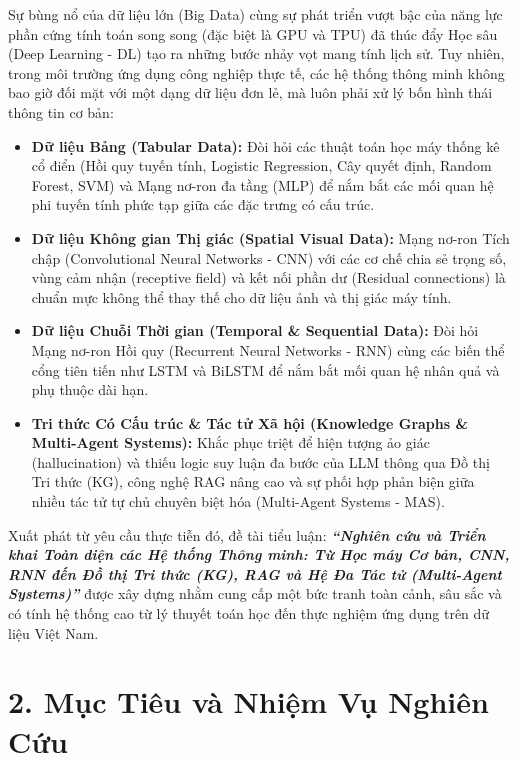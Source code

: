 \documentclass[12pt,a4paper]{report}
\begin{document}
Sự bùng nổ của dữ liệu lớn (Big Data) cùng sự phát triển vượt bậc của năng lực phần cứng tính toán song song (đặc biệt là GPU và TPU) đã thúc đẩy Học sâu (Deep Learning - DL) tạo ra những bước nhảy vọt mang tính lịch sử. Tuy nhiên, trong môi trường ứng dụng công nghiệp thực tế, các hệ thống thông minh không bao giờ đối mặt với một dạng dữ liệu đơn lẻ, mà luôn phải xử lý bốn hình thái thông tin cơ bản:
\begin{itemize}[leftmargin=1.2cm]
    \item \textbf{Dữ liệu Bảng (Tabular Data):} Đòi hỏi các thuật toán học máy thống kê cổ điển (Hồi quy tuyến tính, Logistic Regression, Cây quyết định, Random Forest, SVM) và Mạng nơ-ron đa tầng (MLP) để nắm bắt các mối quan hệ phi tuyến tính phức tạp giữa các đặc trưng có cấu trúc.
    \item \textbf{Dữ liệu Không gian Thị giác (Spatial Visual Data):} Mạng nơ-ron Tích chập (Convolutional Neural Networks - CNN) với các cơ chế chia sẻ trọng số, vùng cảm nhận (receptive field) và kết nối phần dư (Residual connections) là chuẩn mực không thể thay thế cho dữ liệu ảnh và thị giác máy tính.
    \item \textbf{Dữ liệu Chuỗi Thời gian (Temporal \& Sequential Data):} Đòi hỏi Mạng nơ-ron Hồi quy (Recurrent Neural Networks - RNN) cùng các biến thể cổng tiên tiến như LSTM và BiLSTM để nắm bắt mối quan hệ nhân quả và phụ thuộc dài hạn.
    \item \textbf{Tri thức Có Cấu trúc \& Tác tử Xã hội (Knowledge Graphs \& Multi-Agent Systems):} Khắc phục triệt để hiện tượng ảo giác (hallucination) và thiếu logic suy luận đa bước của LLM thông qua Đồ thị Tri thức (KG), công nghệ RAG nâng cao và sự phối hợp phản biện giữa nhiều tác tử tự chủ chuyên biệt hóa (Multi-Agent Systems - MAS).
\end{itemize}

Xuất phát từ yêu cầu thực tiễn đó, đề tài tiểu luận: \textbf{\textit{“Nghiên cứu và Triển khai Toàn diện các Hệ thống Thông minh: Từ Học máy Cơ bản, CNN, RNN đến Đồ thị Tri thức (KG), RAG và Hệ Đa Tác tử (Multi-Agent Systems)”}} được xây dựng nhằm cung cấp một bức tranh toàn cảnh, sâu sắc và có tính hệ thống cao từ lý thuyết toán học đến thực nghiệm ứng dụng trên dữ liệu Việt Nam.

\section*{2. Mục Tiêu và Nhiệm Vụ Nghiên Cứu}
\end{document}
